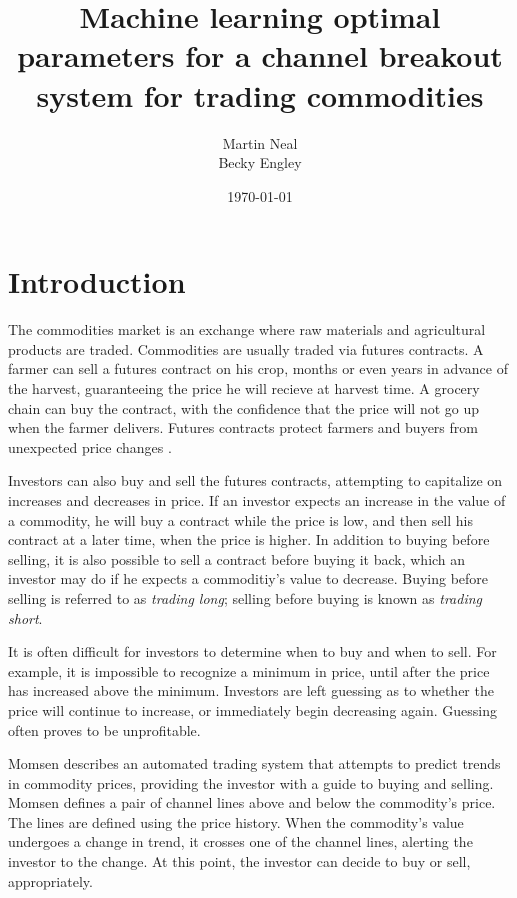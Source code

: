 \documentclass[12pt]{article}
\begin{document}
\title{Machine learning optimal parameters for a channel breakout system for trading
commodities}
\author{Martin Neal\\
  Becky Engley}
\date{\today}
\maketitle

\section{Introduction}

The commodities market is an exchange where raw materials and agricultural
products are traded. Commodities are usually traded via futures contracts. A
farmer can sell a futures contract on his crop, months or even years in advance
of the harvest, guaranteeing the price he will recieve at harvest time. A
grocery chain can buy the contract, with the confidence that the price will not
go up when the farmer delivers. Futures contracts protect farmers and buyers
from unexpected price changes \cite{Wikipedia}.

Investors can also buy and sell the futures contracts, attempting to capitalize
on increases and decreases in price. If an investor expects an increase in the
value of a commodity, he will buy a contract while the price is low, and then
sell his contract at a later time, when the price is higher. In addition to
buying before selling, it is also possible to sell a contract before buying it
back, which an investor may do if he expects a commoditiy's value to decrease.
Buying before selling is referred to as \emph{trading long}; selling before
buying is known as \emph{trading short}.

It is often difficult for investors to determine when to buy and when to sell.
For example, it is impossible to recognize a minimum in price, until after the
price has increased above the minimum. Investors are left guessing as to
whether the price will continue to increase, or immediately begin decreasing
again. Guessing often proves to be unprofitable.

Momsen \cite{Momsen} describes an automated trading system that attempts to
predict trends in commodity prices, providing the investor with a guide to
buying and selling.  Momsen defines a pair of channel lines above and below the
commodity's price.  The lines are defined using the price history. When the
commodity's value undergoes a change in trend, it crosses one of the channel
lines, alerting the investor to the change. At this point, the investor can
decide to buy or sell, appropriately.
\end{document}
